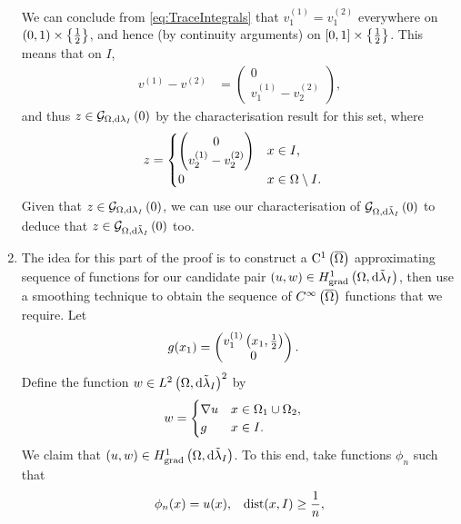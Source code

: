 \documentclass[11pt]{report}
\theoremstyle{plain}
\newcommand{\tlambda}{\tilde{\lambda}}
\newcommand{\C}[1]{\mathrm{C}^1\bracs{#1}}
\begin{document}
\begin{enumerate}
	We can conclude from \eqref{eq:TraceIntegrals} that $v^{(1)}_1 = v^{(2)}_1$ everywhere on $\left( 0,1 \right)\times\left\{ \frac{1}{2} \right\}$, and hence (by continuity arguments) on $\left[ 0,1 \right]\times\left\{ \frac{1}{2} \right\}$.
	This means that on $I$,
	\begin{align*}
		v^{(1)} - v^{(2)} &= \begin{pmatrix} 0 \\ v^{(1)}_1 - v^{(2)}_2 \end{pmatrix},
	\end{align*}
	and thus $z\in\mathcal{G}_{ \Omega, \mathrm{d}\lambda_I}\left( 0 \right)$ by the characterisation result for this set, where
	\begin{align*}
		z &= \begin{cases}
		\begin{pmatrix} 0 \\ v^{(1)}_2 - v^{(2)}_2 \end{pmatrix} & x\in I, \\
		0 & x\in\Omega\setminus I.
		\end{cases}
	\end{align*}
	Given that $z\in\mathcal{G}_{ \Omega, \mathrm{d}\lambda_I}\left( 0 \right)$, we can use our characterisation of $\gradZero{\ddom}{\tlambda_I}$ to deduce that $z\in\gradZero{\ddom}{\tlambda_I}$ too.
	\item The idea for this part of the proof is to construct a $\C{\overline{\ddom}}$ approximating sequence of functions for our candidate pair $\bracs{u,w}\in\gradSob{\ddom}{\tlambda_I}$, then use a smoothing technique to obtain the sequence of $C^{\infty}\left( \overline{\Omega} \right)$ functions that we require.
	Let
	\begin{align*}
		g(x_1) &= 
		\begin{pmatrix}
			v^{(1)}_1\left( x_1,\frac{1}{2} \right) \\
			0
		\end{pmatrix}.
	\end{align*}
	Define the function $w\in\ltwo{\ddom}{\tlambda_I}^2$ by
	\begin{align*}
		w &= \begin{cases} \nabla u & x\in\Omega_1 \cup \Omega_2, \\ g & x\in I. \end{cases}
	\end{align*}
	We claim that $\bracs{u,w}\in\gradSob{\ddom}{\tlambda_I}$.
	To this end, take functions $\phi_n$ such that
	\begin{subequations} \label{eq:SpecificReqs}
		\begin{align}
			\phi_n(x) = u(x), &\quad \mathrm{dist}(x,I)\geq\recip{n}, \\

\end{align}
\end{subequations}
\end{enumerate}
\end{document}
